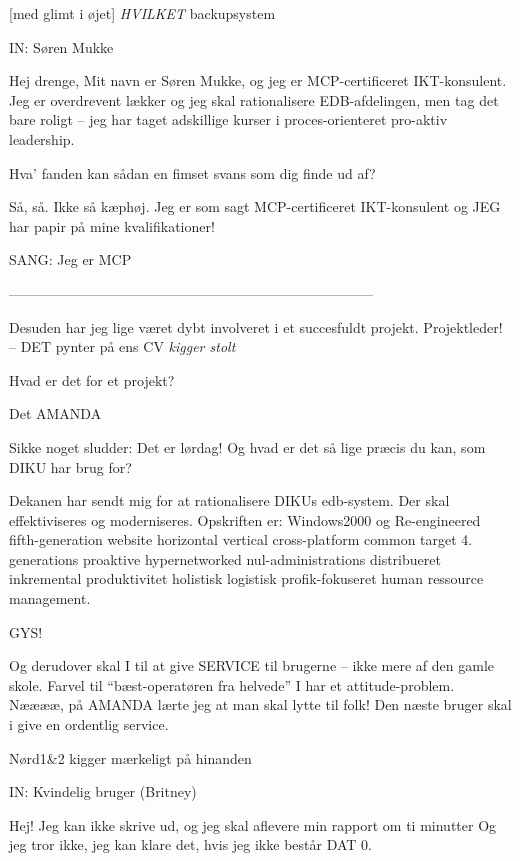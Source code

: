 \documentclass[danish]{article}
\begin{document}
\begin{sketch}
[med glimt i øjet] \emph{HVILKET} backupsystem 

\scene IN: Søren Mukke

 Hej drenge, Mit navn er Søren Mukke, og jeg er MCP-certificeret
IKT-konsulent. Jeg er overdrevent lækker og jeg skal rationalisere
EDB-afdelingen, men tag det bare roligt -- jeg har taget adskillige kurser i
proces-orienteret pro-aktiv leadership.

 Hva' fanden kan sådan en fimset svans som dig finde ud af?

 Så, så. Ikke så kæphøj. Jeg er som sagt MCP-certificeret IKT-konsulent
og JEG har papir på mine kvalifikationer!

\scene SANG: Jeg er MCP

\scene ------------------------------------------------------------------------------

 Desuden har jeg lige været dybt involveret i et succesfuldt projekt.
Projektleder! -- DET pynter på ens CV \emph{kigger stolt}

 Hvad er det for et projekt?

 Det AMANDA

 Sikke noget sludder: Det er lørdag! Og hvad er det så lige præcis
du kan, som DIKU har brug for?

 Dekanen har sendt mig for at rationalisere DIKUs edb-system. Der skal
effektiviseres og moderniseres. Opskriften er: Windows2000 og  Re-engineered fifth-generation website horizontal vertical cross-platform
common target 4. generations proaktive hypernetworked nul-administrations
distribueret inkremental produktivitet holistisk logistisk profik-fokuseret
human ressource management.

 GYS!

 Og derudover skal I til at give SERVICE til brugerne -- ikke mere af
den gamle skole. Farvel til ``bæst-operatøren fra helvede'' I har et
attitude-problem. Nææææ, på AMANDA lærte jeg at man skal lytte til folk! Den
næste bruger skal i give en ordentlig service.

\scene Nørd1\&2 kigger mærkeligt på hinanden

\scene IN: Kvindelig bruger (Britney)

 Hej! Jeg kan ikke skrive ud, og jeg skal aflevere min rapport om ti
minutter  Og jeg tror ikke, jeg kan klare det, hvis jeg ikke består DAT
0.


\end{sketch}
\end{document}
